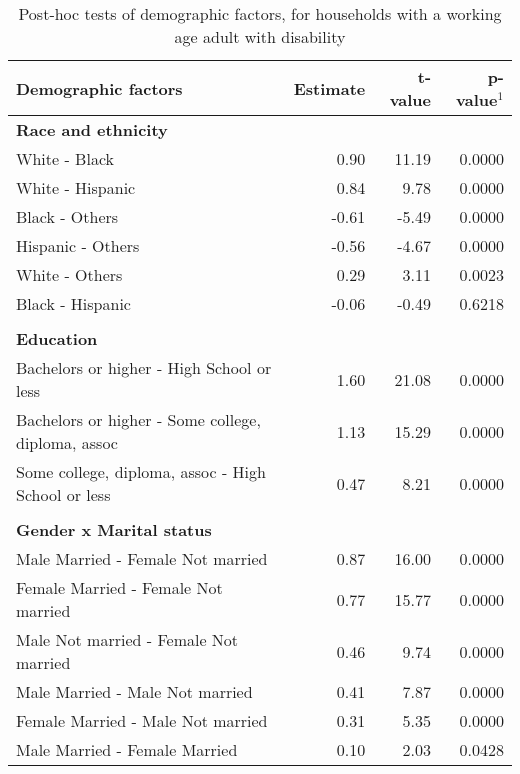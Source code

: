 \singlespacing
\begin{center}
\footnotesize           %
\begin{longtable}{lrrr}

  \caption[Post-hoc tests]{Post-hoc tests of demographic factors, for households with a working age adult with disability} \\
  \hline
  Demographic factors & Estimate & t-value & p-value$^1$ \\ 
  \hline
  \endhead

  \hline
  \endfoot
{\bf{Race and ethnicity}} & & & \\
   White - Black & 0.90 & 11.19 & 0.0000 \\ 
   White - Hispanic & 0.84 & 9.78 & 0.0000 \\ 
   Black - Others & -0.61 & -5.49 & 0.0000 \\ 
   Hispanic - Others & -0.56 & -4.67 & 0.0000 \\ 
   White - Others & 0.29 & 3.11 & 0.0023 \\ 
   Black - Hispanic & -0.06 & -0.49 & 0.6218 \\ 

{\bf{  }} & & & \\
{\bf{Education}} & & & \\
\hline
   Bachelors or higher - High School or less & 1.60 & 21.08 & 0.0000 \\ 
   Bachelors or higher - Some college, diploma, assoc & 1.13 & 15.29 & 0.0000 \\ 
   Some college, diploma, assoc - High School or less & 0.47 & 8.21 & 0.0000 \\ 

{\bf{  }} & & & \\
{\bf{Gender x Marital status}} & & & \\
\hline
    Male Married -  Female Not married & 0.87 & 16.00 & 0.0000 \\ 
    Female Married -  Female Not married & 0.77 & 15.77 & 0.0000 \\ 
    Male Not married -  Female Not married & 0.46 & 9.74 & 0.0000 \\ 
    Male Married -  Male Not married & 0.41 & 7.87 & 0.0000 \\ 
    Female Married -  Male Not married & 0.31 & 5.35 & 0.0000 \\ 
    Male Married -  Female Married & 0.10 & 2.03 & 0.0428 \\ 


\end{longtable}
\end{center}
